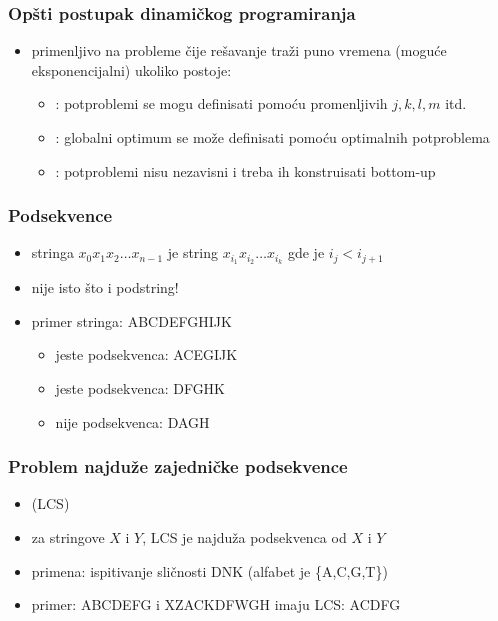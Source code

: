 \documentclass[compress]{beamer}
\begin{document}
\begin{frame}[fragile]
  \frametitle{Opšti postupak dinamičkog programiranja}
  \begin{itemize}
    \item primenljivo na probleme čije rešavanje traži puno vremena 
    (moguće eksponencijalni) ukoliko postoje:
    \begin{itemize}
      \item {}: potproblemi se mogu 
      definisati pomoću promenljivih $j,k,l,m$ itd.
      \item {}: globalni optimum se može 
      definisati pomoću optimalnih potproblema
      \item {}: potproblemi nisu nezavisni
      i treba ih konstruisati bottom-up
    \end{itemize}
  \end{itemize}
\end{frame}

\begin{frame}[fragile]
  \frametitle{Podsekvence}
  \begin{itemize}
    \item {} stringa $x_{0}x_{1}x_{2}\ldots x_{n-1}$ je
    string $x_{i_{1}}x_{i_{2}}\ldots x_{i_{k}}$ gde je $i_{j}<i_{j+1}$
    \item nije isto što i podstring!
    \item primer stringa: ABCDEFGHIJK
    \begin{itemize}
      \item jeste podsekvenca: ACEGIJK
      \item jeste podsekvenca: DFGHK
      \item nije podsekvenca: DAGH
    \end{itemize}
  \end{itemize}
\end{frame}

\begin{frame}[fragile]
  \frametitle{Problem najduže zajedničke podsekvence}
  \begin{itemize}
    \item {} (LCS)
    \item za stringove $X$ i $Y$, LCS je najduža podsekvenca od $X$ i $Y$
    \item primena: ispitivanje sličnosti DNK (alfabet je \{A,C,G,T\})
    \item primer: ABCDEFG i XZACKDFWGH imaju LCS: ACDFG
  \end{itemize}
\end{frame}
\end{document}
